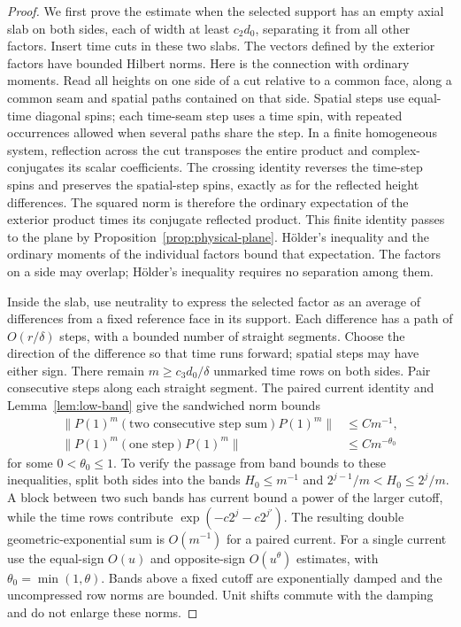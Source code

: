 \begin{proof}
We first prove the estimate when the selected support has an empty axial
slab on both sides, each of width at least \(c_2d_0\), separating it from
all other factors. Insert time cuts in these two slabs.
The vectors defined by the exterior factors have bounded Hilbert norms.
Here is the connection with ordinary moments. Read all heights on one
side of a cut relative to a common face, along a common seam and spatial
paths contained on that side. Spatial steps use equal-time diagonal
spins; each time-seam step uses a time spin, with repeated occurrences
allowed when several paths share the step. In a finite homogeneous
system, reflection across the cut transposes the entire product and
complex-conjugates its scalar coefficients. The crossing identity
reverses the time-step spins and preserves the spatial-step spins,
exactly as for the reflected height differences. The squared norm is
therefore the ordinary expectation of the exterior product times its
conjugate reflected product. This finite identity passes to the plane
by Proposition~\ref{prop:physical-plane}. Hölder's inequality and the
ordinary moments of the individual factors bound that expectation.
The factors on a side may overlap; Hölder's inequality requires no
separation among them.

Inside the slab, use neutrality to express the selected factor as an
average of differences from a fixed reference face in its support.
Each difference has a path of \(O(r/\delta)\) steps, with a bounded
number of straight segments. Choose the direction of the difference
so that time runs forward; spatial steps may have either sign.
There remain \(m\ge c_3d_0/\delta\) unmarked time rows on both sides.
Pair consecutive steps along each straight segment. The paired current
identity and Lemma~\ref{lem:low-band} give the sandwiched norm bounds
\begin{equation}\label{eq:prob-damped-costs}
 \begin{aligned}
 \|P(1)^m(\text{two consecutive step sum})P(1)^m\|
       &\le C m^{-1},\\
 \|P(1)^m(\text{one step})P(1)^m\|
       &\le C m^{-\theta_0}
 \end{aligned}
\end{equation}
for some \(0<\theta_0\le1\). To verify the passage from band bounds to
these inequalities, split both sides into the bands
\(H_0\le m^{-1}\) and
\(2^{j-1}/m<H_0\le2^j/m\).
A block between two such bands has current bound a power of the larger
cutoff, while the time rows contribute
\(\exp(-c2^j-c2^{j'})\). The resulting double geometric-exponential
sum is \(O(m^{-1})\) for a paired current. For a single current use the
equal-sign \(O(u)\) and opposite-sign \(O(u^\theta)\) estimates,
with \(\theta_0=\min(1,\theta)\). Bands above a fixed cutoff are
exponentially damped and the uncompressed row norms are bounded.
Unit shifts commute with the damping and do not enlarge these norms.


\end{proof}
